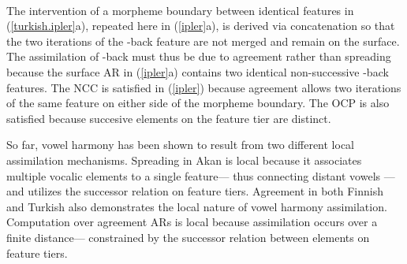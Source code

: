 \documentclass[,doc,floatsintext]{apa6}
\theoremstyle{definition}
\theoremstyle{definition}
\theoremstyle{definition}
\theoremstyle{remark}
\begin{document}
\begin{exe}
\label{ipler} \\
\end{exe}

\noindent The intervention of a morpheme boundary between identical
features in (\ref{turkish.ipler}a), repeated here in (\ref{ipler}a), is
derived via concatenation so that the two iterations of the -back
feature are not merged and remain on the surface. The assimilation of
-back must thus be due to agreement rather than spreading because the
surface AR in (\ref{ipler}a) contains two identical non-successive -back
features. The NCC is satisfied in (\ref{ipler}) because agreement allows
two iterations of the same feature on either side of the morpheme
boundary. The OCP is also satisfied because succesive elements on the
feature tier are distinct.

So far, vowel harmony has been shown to result from two different local
assimilation mechanisms. Spreading in Akan is local because it
associates multiple vocalic elements to a single feature--- thus
connecting distant vowels ---and utilizes the successor relation on
feature tiers. Agreement in both Finnish and Turkish also demonstrates
the local nature of vowel harmony assimilation. Computation over
agreement ARs is local because assimilation occurs over a finite
distance--- constrained by the successor relation between elements on
feature tiers.
\end{document}
